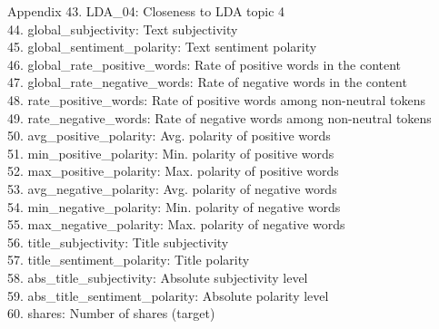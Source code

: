 \documentclass[a4paper,11pt]{article}
\begin{document}
\begin{section}{Appendix}
    43. LDA\_04:                        Closeness to LDA topic 4\\
    44. global\_subjectivity:           Text subjectivity\\
    45. global\_sentiment\_polarity:     Text sentiment polarity\\
    46. global\_rate\_positive\_words:    Rate of positive words in the content\\
    47. global\_rate\_negative\_words:    Rate of negative words in the content\\
    48. rate\_positive\_words:           Rate of positive words among non-neutral
                                       tokens\\
    49. rate\_negative\_words:           Rate of negative words among non-neutral
                                       tokens\\
    50. avg\_positive\_polarity:         Avg. polarity of positive words\\
    51. min\_positive\_polarity:         Min. polarity of positive words\\
    52. max\_positive\_polarity:         Max. polarity of positive words\\
    53. avg\_negative\_polarity:         Avg. polarity of negative  words\\
    54. min\_negative\_polarity:         Min. polarity of negative  words\\
    55. max\_negative\_polarity:         Max. polarity of negative  words\\
    56. title\_subjectivity:            Title subjectivity\\
    57. title\_sentiment\_polarity:      Title polarity\\
    58. abs\_title\_subjectivity:        Absolute subjectivity level\\
    59. abs\_title\_sentiment\_polarity:  Absolute polarity level\\
    60. shares:                        Number of shares (target)\\\\
   

\end{section}
\end{document}
